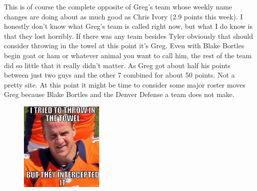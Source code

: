 \documentclass[11pt,letterpaper]{article}
\begin{document}
\bigskip
\par\noindent This is of course the complete opposite of Greg's team whose weekly name changes are doing about as much good as Chris Ivory (2.9 points this week). I honestly don't know what Greg's team is called right now, but what I do know is that they lost horribly. If there was any team besides Tyler obviously that should consider throwing in the towel at this point it's Greg. Even with Blake Bortles begin goat or ham or whatever animal you want to call him, the rest of the team did so little that it really didn't matter. As Greg got about half his points between just two guys and the other 7 combined for about 50 points. Not a pretty site. At this point it might be time to consider some major roster moves Greg because Blake Bortles and the Denver Defense a team does not make. 
\begin{figure}[ht]
\includegraphics[width=0.355\textwidth]{week4-peyton.png}
\label{fig:week4-peyton}
\end{figure}
\vspace{10pt}
\end{document}
